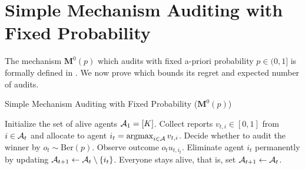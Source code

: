 

\section{Simple Mechanism Auditing with Fixed Probability}\label{sec:appendix fixed-p}

The mechanism $\bm M^0(p)$ which audits with fixed a-priori probability $p\in(0,1]$ is formally defined in . We now prove  which bounds its regret and expected number of audits.

\begin{algorithm}[!t]
\caption{Simple Mechanism Auditing with Fixed Probability ($\bm M^0(p)$)}
\label{alg:simple_mechanism}
\begin{algorithmic}[1]
\State Initialize the set of alive agents $\mathcal{A}_1=[K]$.
\State Collect reports $v_{t,i}\in [0,1]$ from $i\in \mathcal{A}_t$ and allocate to agent $i_t=\argmax_{i\in \mA} v_{t,i}$.
\State Decide whether to audit the winner by $o_t\sim \text{Ber}(p)$. Observe outcome $o_t u_{t,i_t}$.
\State Eliminate agent $i_t$ permanently by updating $\mathcal{A}_{t+1}\gets \mathcal{A}_t\setminus \{i_t\}$.
\Else
\State Everyone stays alive, that is, set $\mathcal{A}_{t+1}\gets \mathcal{A}_t$.
\EndIf
\EndFor
\end{algorithmic}
\end{algorithm}

